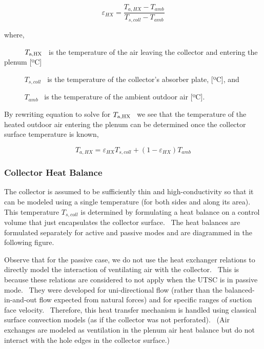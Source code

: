 \begin{equation}
{\varepsilon_{HX}} = \frac{{{T_{a,HX}} - {T_{amb}}}}{{{T_{s,coll}} - {T_{amb}}}}
\end{equation}

where,

~~~~~ \({T_{{\rm{a,HX}}}}\) ~is the temperature of the air leaving the collector and entering the plenum {[}ºC{]}

~~~~~ \({T_{s,coll}}\) ~is the temperature of the collector's absorber plate, {[}ºC{]}, and

~~~~~ \({T_{amb}}\) ~is the temperature of the ambient outdoor air {[}ºC{]}.

By rewriting equation to solve for \({T_{{\rm{a,HX}}}}\) ~we see that the temperature of the heated outdoor air entering the plenum can be determined once the collector surface temperature is known,

\begin{equation}
{T_{a,HX}} = {\varepsilon_{HX}}{T_{s,coll}} + \left( {1 - {\varepsilon_{HX}}} \right){T_{amb}}
\end{equation}

\subsubsection{Collector Heat Balance}\label{collector-heat-balance}

The collector is assumed to be sufficiently thin and high-conductivity so that it can be modeled using a single temperature (for both sides and along its area).~ This temperature \({T_{s,coll}}\) is determined by formulating a heat balance on a control volume that just encapsulates the collector surface.~ The heat balances are formulated separately for active and passive modes and are diagrammed in the following figure.

Observe that for the passive case, we do not use the heat exchanger relations to directly model the interaction of ventilating air with the collector.~ This is because these relations are considered to not apply when the UTSC is in passive mode.~ They were developed for uni-directional flow (rather than the balanced-in-and-out flow expected from natural forces) and for specific ranges of suction face velocity.~ Therefore, this heat transfer mechanism is handled using classical surface convection models (as if the collector was not perforated).~ (Air exchanges are modeled as ventilation in the plenum air heat balance but do not interact with the hole edges in the collector surface.)

